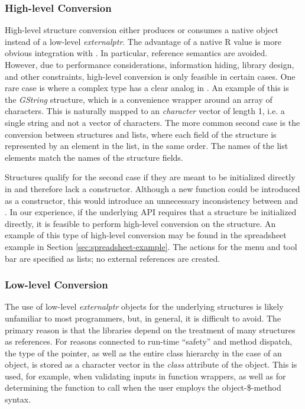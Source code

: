 \documentclass[article]{jss}
\begin{document}
\subsubsection[High-level Conversion]{High-level
Conversion}\label{sec:high-level-conversion}

High-level structure conversion either produces or consumes a native
 object instead of a low-level \emph{externalptr}. The
advantage of a native R value is more obvious integration with
. In particular, reference semantics are avoided.
However, due to performance considerations, information hiding,
library design, and other constraints, high-level conversion is only
feasible in certain cases.  One rare case is where a complex
 type has a clear analog in .  An example of
this is the \emph{GString} structure, which is a convenience wrapper
around an array of characters. This is naturally mapped to an
 \emph{character} vector of length 1, i.e. a single string and
not a vector of characters. The more common second case is
the conversion between  structures and  lists,
where each field of the structure is represented by an element in the
list, in the same order. The names of the list elements match the
names of the structure fields.

Structures qualify for the second case if they are meant to be
initialized directly in  and therefore lack a constructor.
Although a new function could be introduced as a constructor, this
would introduce an unnecessary inconsistency between  and
.
In our experience, if the underlying API requires that a structure be initialized directly, it is feasible to perform high-level conversion on the structure. An example of this type of high-level conversion may be found in the spreadsheet example in Section \ref{sec:spreadsheet-example}. The actions for the menu and tool bar are specified as lists; no external references are created.

\subsubsection[Low-level Conversion]{Low-level Conversion}

The use of low-level \emph{externalptr} objects for the underlying
 structures is likely unfamiliar to most 
programmers, but, in general, it is difficult to avoid. The primary
reason is that the  libraries depend on the treatment of
many structures as references. For reasons connected to run-time
``safety'' and method dispatch, the type of the pointer, as well as
the entire class hierarchy in the case of an object, is stored as a
character vector in the \emph{class} attribute of the 
object. 
This is used, for example, when validating inputs in
function wrappers, as well as for determining the function to call
when the user employs the object-\$-method syntax.
\end{document}
